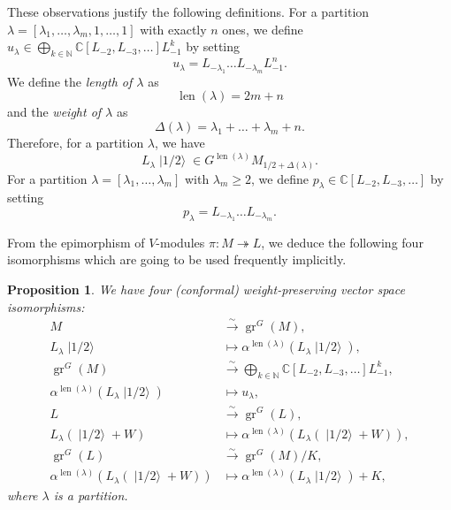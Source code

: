 \documentclass[a4paper, 12pt, reqno]{amsart}
\newtheorem{proposition}[theorem]{Proposition}
\theoremstyle{remark}
\DeclareMathOperator{\gr}{gr}
\DeclareMathOperator{\len}{len}
\DeclareMathOperator{\vachalf}{|1/2\rangle}
\begin{document}
These observations justify the following definitions.
For a partition $\lambda = [\lambda_1, \dots, \lambda_m, 1, \dots, 1]$ with exactly $n$ ones, we define $u_{\lambda} \in \bigoplus_{k \in \mathbb{N}}\mathbb{C}[L_{-2}, L_{-3}, \dots]L_{-1}^k$ by setting
\begin{equation*}
  u_{\lambda} = L_{-\lambda_1}\dots L_{-\lambda_m}L_{-1}^n.
\end{equation*}
We define the \emph{length of $\lambda$} as
\begin{equation*}
  \len(\lambda) = 2m + n
\end{equation*}
and the \emph{weight of $\lambda$} as
\begin{equation*}
  \Delta(\lambda) = \lambda_1 + \dots + \lambda_m + n.
\end{equation*}
Therefore, for a partition $\lambda$, we have
\begin{equation*}
  L_{\lambda}\vachalf \in G^{\len(\lambda)}M_{1/2 + \Delta(\lambda)}.
\end{equation*}
For a partition $\lambda = [\lambda_1, \dots, \lambda_m]$ with $\lambda_m \ge 2$, we define $p_{\lambda} \in \mathbb{C}[L_{-2}, L_{-3}, \dots]$ by setting
\begin{equation*}
  p_{\lambda} = L_{-\lambda_1}\dots L_{-\lambda_m}.
\end{equation*}

From the epimorphism of $V$-modules $\pi: M \twoheadrightarrow L$, we deduce the following four isomorphisms which are going to be used frequently implicitly.

\begin{proposition}
  \label{prp:4}
  We have four (conformal) weight-preserving vector space isomorphisms:
  \begin{align*}
    M &\xrightarrow{\sim} \gr^G(M), \\
    L_{\lambda}\vachalf &\mapsto \alpha^{\len(\lambda)}(L_{\lambda}\vachalf), \\
    \gr^G(M) &\xrightarrow{\sim} \bigoplus_{k \in \mathbb{N}}\mathbb{C}[L_{-2}, L_{-3}, \dots]L_{-1}^k, \\
    \alpha^{\len(\lambda)}(L_{\lambda}\vachalf) &\mapsto u_{\lambda}, \\
    L &\xrightarrow{\sim} \gr^G(L), \\
    L_{\lambda}(\vachalf + W) &\mapsto \alpha^{\len(\lambda)}(L_{\lambda}(\vachalf + W)), \\
    \gr^G(L) &\xrightarrow{\sim} \gr^G(M)/K, \\
    \alpha^{\len(\lambda)}(L_{\lambda}(\vachalf + W)) &\mapsto \alpha^{\len(\lambda)}(L_{\lambda}\vachalf) + K,
  \end{align*}
  where $\lambda$ is a partition.
\end{proposition}
\end{document}
